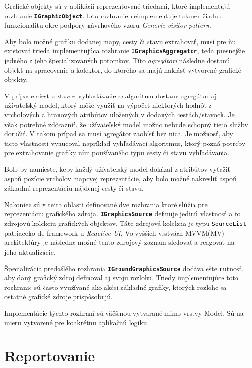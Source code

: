 \bigskip

Grafické objekty sú v aplikácii reprezentované triedami, ktoré implementujú rozhranie \textbf{\texttt{IGraphicObject}}.Toto rozhranie neimplementuje takmer žiadnu funkcionalitu okre podpory návrhového vzoru \textit{Generic visitor pattern}.

Aby bolo možné grafiku dodanej mapy, cesty či stavu extrahovať, musí pre ňu existovať trieda implementujúca rozhranie \textbf{\texttt{IGraphicsAggregator}}, teda presnejšie jedného z jeho špecializovaných potomkov. Títo \textit{agregátori} následne dostanú objekt na spracovanie a kolektor, do ktorého sa majú naklásť vytvorené grafické objekty.

V prípade ciest a stavov vyhľadávacieho algoritmu dostane agregátor aj užívateľský model, ktorý môže využiť na výpočet niektorých hodnôt z vrcholových a hranových atribútov uložených v dodaných cestách/stavoch. Je však potrebné zdôrazniť, že užívateľský model možno nebude schopný tieto služby doručiť. V takom prípad sa musí agregátor zaobísť bez nich. Je možnosť, aby tieto vlastnosti vynucoval napríklad vyhľadávací algoritmus, ktorý pozná potreby pre extrahovanie grafiky ním používaného typu cesty či stavu vyhľadávania.

Bolo by namieste, keby každý užívateľský model dokázal z atribútov vyťažiť aspoň pozície vrcholov mapovej reprezentácie, aby bolo možné nakresliť aspoň základnú reprezentáciu nájdenej cesty či stavu. 

\bigskip

Nakoniec sú v tejto oblasti definované dve rozhrania ktoré slúžia pre reprezentáciu grafického zdroja. \textbf{\texttt{IGraphicsSource}} definuje jedinú vlastnosť a to zdrojovú kolekciu grafických objektov. Táto zdrojová kolekcia je typu \texttt{SourceList} patriaceho do framework-u \textit{Reactive UI}. Vo vyšších vrstvách MVVM(MV) architektúry je následne možné tento zdrojový zoznam sledovať a reagovať na jeho aktualizácie. 

Špecializácia predošlého rozhrania \textbf{\texttt{IGroundGraphicsSource}} dodáva ešte nutnosť, aby daný grafický zdroj definoval aj svoju rozlohu. Triedy implementujúce toto rozhranie sú často využívané ako akési základné grafiky, ktorých rozlohe sa ostatné grafické zdroje prispôsobujú.

Implementácie týchto rozhraní sú väčšinou vytvárané mimo vrstvy Model. Sú na mieru vytvorené pre konkrétnu aplikačnú logiku. 

\section{Reportovanie}

